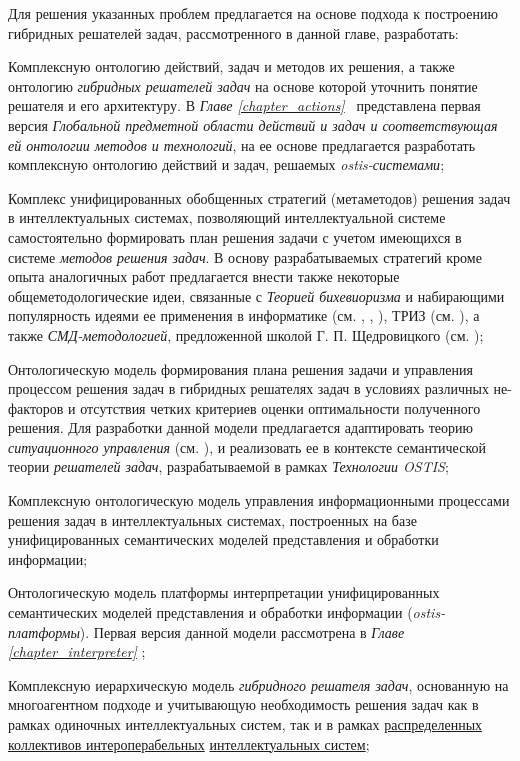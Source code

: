 Для решения указанных проблем предлагается на основе подхода к построению гибридных решателей задач, рассмотренного в данной главе, разработать:
\begin{textitemize}
	\item Комплексную онтологию действий, задач и методов их решения, а также онтологию \textit{гибридных решателей задач} на основе которой уточнить понятие решателя и его архитектуру. В \textit{Главе \ref{chapter_actions}~} представлена первая версия \textit{Глобальной предметной области действий и задач и соответствующая ей онтологии методов и технологий}, на ее основе предлагается разработать комплексную онтологию действий и задач, решаемых \textit{ostis-системами};
	\item Комплекс унифицированных обобщенных стратегий (метаметодов) решения задач в интеллектуальных системах, позволяющий интеллектуальной системе самостоятельно формировать план решения задачи с учетом имеющихся в системе \textit{методов решения задач}. В основу разрабатываемых стратегий кроме опыта аналогичных работ предлагается внести также некоторые общеметодологические идеи, связанные с \textit{Теорией бихевиоризма} и набирающими популярность идеями ее применения в информатике (см. , , ), ТРИЗ (см. ), а также \textit{СМД-методологией}, предложенной школой Г. П. Щедровицкого (см. );
	\item Онтологическую модель формирования плана решения задачи и управления процессом решения задач в гибридных решателях задач в условиях различных не-факторов и отсутствия четких критериев оценки оптимальности полученного решения. Для разработки данной модели предлагается адаптировать теорию \textit{ситуационного управления} (см. ), и реализовать ее в контексте семантической теории \textit{решателей задач}, разрабатываемой в рамках \textit{Технологии OSTIS};
	\item Комплексную онтологическую модель управления информационными процессами решения задач в интеллектуальных системах, построенных на базе унифицированных семантических моделей представления и обработки информации;
	\item Онтологическую модель платформы интерпретации унифицированных семантических моделей представления и обработки информации (\textit{ostis-платформы}). Первая версия данной модели рассмотрена в \textit{Главе \ref{chapter_interpreter} };
	\item Комплексную иерархическую модель \textit{гибридного решателя задач}, основанную на многоагентном подходе и учитывающую необходимость решения задач как в рамках одиночных интеллектуальных систем, так и в рамках \underline{распределенных} \underline{коллективов интероперабельных} \underline{интеллектуальных систем};

\end{textitemize}
